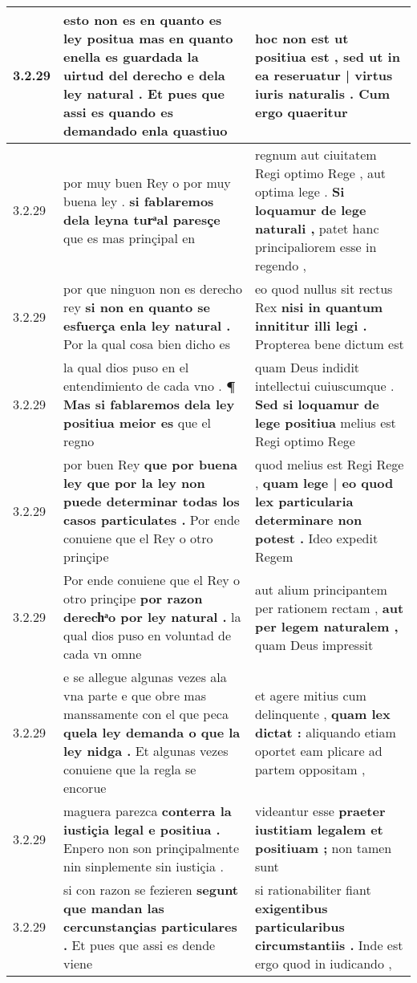 \begin{tabular}{|p{1cm}|p{6.5cm}|p{6.5cm}|}
3.2.29 & esto non es en quanto es ley positua \textbf{ mas en quanto enella es guardada la uirtud del derecho e dela ley natural . } Et pues que assi es quando es demandado enla quastiuo & hoc non est ut positiua est , \textbf{ sed ut in ea reseruatur | virtus iuris naturalis . } Cum ergo quaeritur \\\hline
3.2.29 & por muy buen Rey o por muy buena ley . \textbf{ si fablaremos dela leyna turͣal paresçe } que es mas prinçipal en & regnum aut ciuitatem Regi optimo Rege , aut optima lege . \textbf{ Si loquamur de lege naturali , } patet hanc principaliorem esse in regendo , \\\hline
3.2.29 & por que ninguon non es derecho rey \textbf{ si non en quanto se esfuerça enla ley natural . } Por la qual cosa bien dicho es & eo quod nullus sit rectus Rex \textbf{ nisi in quantum innititur illi legi . } Propterea bene dictum est \\\hline
3.2.29 & la qual dios puso en el entendimiento de cada vno . \textbf{ ¶ Mas si fablaremos dela ley positiua meior es } que el regno & quam Deus indidit intellectui cuiuscumque . \textbf{ Sed si loquamur de lege positiua } melius est Regi optimo Rege \\\hline
3.2.29 & por buen Rey \textbf{ que por buena ley que por la ley non puede determinar todas los casos particulates . } Por ende conuiene que el Rey o otro prinçipe & quod melius est Regi Rege , \textbf{ quam lege | eo quod lex particularia determinare non potest . } Ideo expedit Regem \\\hline
3.2.29 & Por ende conuiene que el Rey o otro prinçipe \textbf{ por razon derechͣo por ley natural . } la qual dios puso en voluntad de cada vn omne & aut alium principantem per rationem rectam , \textbf{ aut per legem naturalem , } quam Deus impressit \\\hline
3.2.29 & e se allegue algunas vezes ala vna parte e que obre mas manssamente con el que peca \textbf{ quela ley demanda o que la ley nidga . } Et algunas vezes conuiene que la regla se encorue & et agere mitius cum delinquente , \textbf{ quam lex dictat : } aliquando etiam oportet eam plicare ad partem oppositam , \\\hline
3.2.29 & maguera parezca \textbf{ conterra la iustiçia legal e positiua . } Enpero non son prinçipalmente nin sinplemente sin iustiçia . & videantur esse \textbf{ praeter iustitiam legalem et positiuam ; } non tamen sunt \\\hline
3.2.29 & si con razon se fezieren \textbf{ segunt que mandan las cercunstançias particulares . } Et pues que assi es dende viene & si rationabiliter fiant \textbf{ exigentibus particularibus circumstantiis . } Inde est ergo quod in iudicando , \\\hline

\end{tabular}
